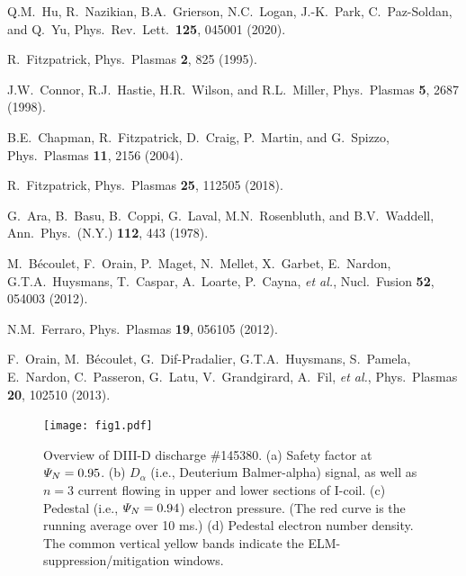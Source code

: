 \documentclass[12pt,prb,aps]{revtex4-1}
\begin{document}
\begin{thebibliography}{99}
 Q.M.~Hu,  R.~Nazikian,  B.A.~Grierson,  N.C.~Logan,  J.-K.~Park,  C.~Paz-Soldan, and Q.~Yu, Phys.\ Rev.\ Lett.\ {\bf 125}, 045001 (2020).

 R.~Fitzpatrick, Phys.\ Plasmas {\bf 2}, 825 (1995).

 J.W.~Connor,  R.J.~Hastie, H.R.~Wilson, and R.L.~Miller, Phys.\ Plasmas  {\bf 5}, 2687 (1998).

 B.E.~Chapman, R.~Fitzpatrick, D.~Craig, P.~Martin, and G.~Spizzo, Phys.\ Plasmas {\bf 11}, 2156 (2004).

 R.~Fitzpatrick, Phys.\ Plasmas {\bf 25}, 112505 (2018).

 G.~Ara,  B.~Basu, B.~Coppi, G.~Laval, M.N.~Rosenbluth, and B.V.~Waddell, Ann.\ Phys.\ (N.Y.) {\bf 112}, 443 (1978). 

 M.~B\'{e}coulet, F.~Orain, P.~Maget, N.~Mellet, X.~Garbet, E.~Nardon, G.T.A.~Huysmans, T.~Caspar, A.~Loarte,  P.~Cayna, {\em et al.}, 
Nucl.\ Fusion {\bf 52}, 054003  (2012).

 N.M.~Ferraro, Phys.\ Plasmas {\bf 19}, 056105  (2012).

 F.~Orain, M.~B\'{e}coulet, G.~Dif-Pradalier, G.T.A.~Huysmans, S.~Pamela,   E.~Nardon, C.~Passeron, G.~Latu, V.~Grandgirard, A.~Fil, {\em et al.}, 
Phys.\ Plasmas {\bf 20}, 102510 (2013). 

\end{thebibliography}

\newpage

\begin{figure}
\texttt{[image: fig1.pdf]}
\caption{Overview of DIII-D discharge \#145380.
(a) Safety factor at  ${\mit\Psi}_N=0.95$. 
(b) $D_\alpha$ (i.e., Deuterium Balmer-alpha) signal, as well as $n=3$ current flowing in upper and lower sections of I-coil. 
(c) Pedestal (i.e., ${\mit\Psi}_N=0.94$)
electron pressure. (The red curve is the running average over 10 ms.) (d) Pedestal electron number density. The common vertical yellow bands indicate the ELM-suppression/mitigation windows.}\label{fig1}
\end{figure}
\end{document}
